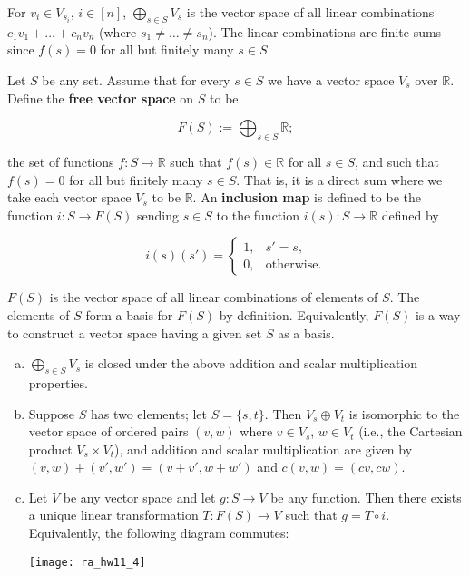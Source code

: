 For \(v_i \in V_{s_i}\), \(i \in [n]\), \(\bigoplus_{s \in S} V_s\) is the vector space of all linear combinations \(c_1 v_1 + \ldots + c_n v_n\) (where \(s_1 \neq \ldots \neq s_n\)). The linear combinations are finite sums since \(f(s) = 0\) for all but finitely many \(s \in S\). 

\begin{definition}\label{ra.def.free.vector.space}

Let \(S\) be any set. Assume that for every \(s \in S\) we have a vector space \(V_s\) over \(\mathbb{R}\). Define the \textbf{free vector space} on \(S\) to be

\[
F(S) := \bigoplus_{s \in S} \mathbb{R};
\]

the set of functions \(f: S \to \mathbb{R} \) such that \(f(s) \in \mathbb{R}\) for all \(s \in S\), and such that \(f(s) = 0\) for all but finitely many \(s \in S\). That is, it is a direct sum where we take each vector space \(V_s \) to be \(\mathbb{R}\). An \textbf{inclusion map} is defined to be the function \(i: S \to F(S)\) sending \(s \in S\) to the function \(i(s): S \to \mathbb{R}\) defined by 

\[
i(s)(s') = \begin{cases} 
1, & s' = s, \\
0, & \text{otherwise.}
\end{cases}
\] 

\end{definition}

\(F(S)\) is the vector space of all linear combinations of elements of \(S\). The elements of \(S\) form a basis for \(F(S)\) by definition. Equivalently, \(F(S)\) is a way to construct a vector space having a given set \(S\) as a basis.

\begin{proposition}\label{ra.hw11.prob.4}

\begin{enumerate}[(a)]

\item \(\bigoplus_{s \in S} V_s\) is closed under the above addition and scalar multiplication properties.

\item Suppose \(S\) has two elements; let \(S = \{s, t\}\). Then \(V_s \oplus V_t\) is isomorphic to the vector space of ordered pairs \((v,w)\) where \(v \in V_s\), \(w \in V_t\) (i.e., the Cartesian product \(V_s \times V_t\)), and addition and scalar multiplication are given by \((v,w) + (v', w') = (v + v', w+ w')\) and \(c(v,w) = (cv, cw)\).

\item Let \(V\) be any vector space and let \(g: S \to V\) be any function. Then there exists a unique linear transformation \(T: F(S) \to V\) such that \(g = T \circ i\). Equivalently, the following diagram commutes:

\begin{center}
\texttt{[image: ra\_hw11\_4]}
\end{center}

\end{enumerate}

\end{proposition}

